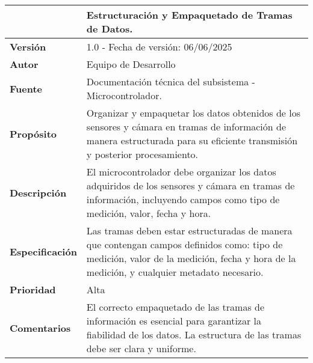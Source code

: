 \begin{longtable}{|l|p{12cm}|}
\hline
\textbf{} & \textbf{Estructuración y Empaquetado de Tramas de Datos.} \\
\hline
\endfirsthead
\hline
\textbf{Versión} & 1.0 - Fecha de versión: 06/06/2025 \\
\hline
\textbf{Autor} & Equipo de Desarrollo \\
\hline
\textbf{Fuente} & Documentación técnica del subsistema - Microcontrolador. \\
\hline
\textbf{Propósito} & Organizar y empaquetar los datos obtenidos de los sensores y cámara en tramas de información de manera estructurada para su eficiente transmisión y posterior procesamiento. \\
\hline
\textbf{Descripción} & El microcontrolador debe organizar los datos adquiridos de los sensores y cámara en tramas de información, incluyendo campos como tipo de medición, valor, fecha y hora. \\
\hline
\textbf{Especificación} & Las tramas deben estar estructuradas de manera que contengan campos definidos como: tipo de medición, valor de la medición, fecha y hora de la medición, y cualquier metadato necesario. \\
\hline
\textbf{Prioridad} & Alta \\
\hline
\textbf{Comentarios} & El correcto empaquetado de las tramas de información es esencial para garantizar la fiabilidad de los datos. La estructura de las tramas debe ser clara y uniforme. \\
\hline
\end{longtable}

